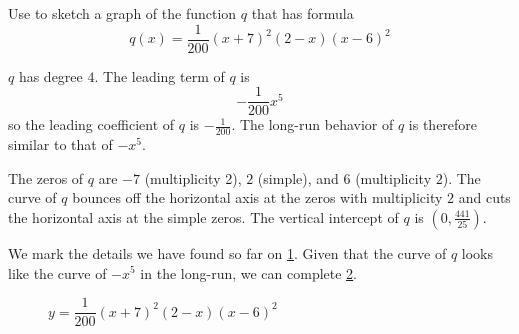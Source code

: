 	 \begin{pccexample}\label{poly:ex:degree5}
		 Use  to sketch a graph of the function $q$
		 that has formula
		 \[
			 q(x)=\frac{1}{200}(x+7)^2(2-x)(x-6)^2
		 \]
		 \begin{pccsolution}
			 \begin{steps}
				 \item $q$ has degree $4$. The leading term of $q$ is
				 \[
					 -\frac{1}{200}x^5
				 \]
				 so the leading coefficient of $q$ is $-\frac{1}{200}$. The long-run behavior of $q$
				 is therefore similar to that of $-x^5$.
				 \item The zeros of $q$ are $-7$ (multiplicity 2), $2$ (simple), and $6$ (multiplicity $2$).
				 The curve of $q$ bounces off the horizontal axis at the zeros with multiplicity $2$ and
				 cuts the horizontal axis at the simple zeros. The vertical intercept of $q$ is $\left( 0,\frac{441}{25} \right)$.
				 \item We mark the details we have found so far on \cref{poly:fig:degree5p1}. Given that
				 the curve of $q$ looks like the curve of $-x^5$ in the long-run, we can complete \cref{poly:fig:degree5p2}.
			 \end{steps}

			 \begin{figure}[!htbp]
				 \begin{subfigure}{.45\textwidth}
					 \caption{}
					 \label{poly:fig:degree5p1}
				 \end{subfigure}%
				 \hfill
				 \begin{subfigure}{.45\textwidth}
					 \caption{}
					 \label{poly:fig:degree5p2}
				 \end{subfigure}%
				 \caption{$y=\dfrac{1}{200}(x+7)^2(2-x)(x-6)^2$}
				 \label{poly:fig:degree5}
			 \end{figure}
		 \end{pccsolution}
	 \end{pccexample}

